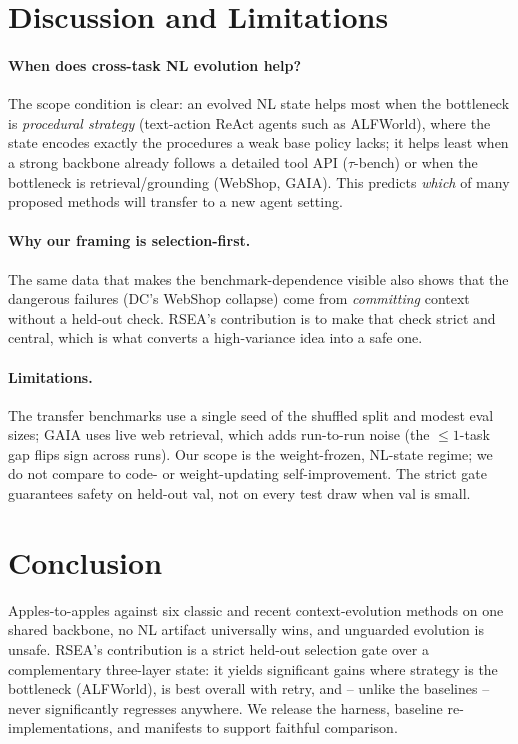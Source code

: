 \documentclass{article}
\begin{document}
\section{Discussion and Limitations}
\paragraph{When does cross-task NL evolution help?} The scope condition is clear: an
evolved NL state helps most when the bottleneck is \emph{procedural strategy}
(text-action ReAct agents such as ALFWorld), where the state encodes exactly the
procedures a weak base policy lacks; it helps least when a strong backbone already
follows a detailed tool API ($\tau$-bench) or when the bottleneck is
retrieval/grounding (WebShop, GAIA). This predicts \emph{which} of many proposed
methods will transfer to a new agent setting.
\paragraph{Why our framing is selection-first.} The same data that makes the
benchmark-dependence visible also shows that the dangerous failures (DC's WebShop
collapse) come from \emph{committing} context without a held-out check. RSEA's
contribution is to make that check strict and central, which is what converts a
high-variance idea into a safe one.
\paragraph{Limitations.} The transfer benchmarks use a single seed of the shuffled
split and modest eval sizes; GAIA uses live web retrieval, which adds run-to-run
noise (the $\le1$-task gap flips sign across runs). Our scope is the weight-frozen,
NL-state regime; we do not compare to code- or weight-updating self-improvement. The
strict gate guarantees safety on held-out val, not on every test draw when val is
small.

\section{Conclusion}
Apples-to-apples against six classic and recent context-evolution methods on one
shared backbone, no NL artifact universally wins, and unguarded evolution is unsafe.
RSEA's contribution is a strict held-out selection gate over a complementary
three-layer state: it yields significant gains where strategy is the bottleneck
(ALFWorld), is best overall with retry, and -- unlike the baselines -- never
significantly regresses anywhere. We release the harness, baseline
re-implementations, and manifests to support faithful comparison.
\end{document}
